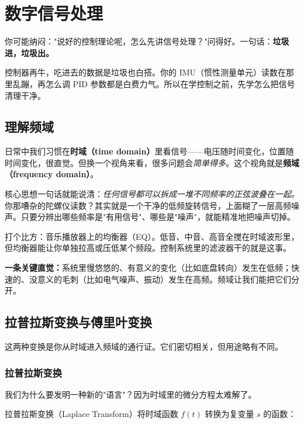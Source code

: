 \section{数字信号处理}

你可能纳闷："说好的控制理论呢，怎么先讲信号处理？"问得好。一句话：\textbf{垃圾进，垃圾出。}

控制器再牛，吃进去的数据是垃圾也白搭。你的 IMU（惯性测量单元）读数在那里乱蹦，再怎么调 PID 参数都是白费力气。所以在学控制之前，先学怎么把信号清理干净。

\subsection{理解频域}

日常中我们习惯在\textbf{时域（time domain）}里看信号——电压随时间变化，位置随时间变化，很直觉。但换一个视角来看，很多问题会\textit{简单得多}。这个视角就是\textbf{频域（frequency domain）}。

核心思想一句话就能说清：\textit{任何信号都可以拆成一堆不同频率的正弦波叠在一起。}你那嘈杂的陀螺仪读数？其实就是一个干净的低频旋转信号，上面糊了一层高频噪声。只要分辨出哪些频率是"有用信号"、哪些是"噪声"，就能精准地把噪声切掉。

打个比方：音乐播放器上的均衡器（EQ）。低音、中音、高音全搅在时域波形里，但均衡器能让你单独拉高或压低某个频段。控制系统里的滤波器干的就是这事。

\textbf{一条关键直觉：}系统里慢悠悠的、有意义的变化（比如底盘转向）发生在低频；快速的、没意义的毛刺（比如电气噪声、振动）发生在高频。频域让我们能把它们分开。

\subsection{拉普拉斯变换与傅里叶变换}

这两种变换是你从时域进入频域的通行证。它们密切相关，但用途略有不同。

\subsubsection{拉普拉斯变换}

我们为什么要发明一种新的"语言"？因为时域里的微分方程太难解了。

拉普拉斯变换（Laplace Transform）将时域函数 $f(t)$ 转换为复变量 $s$ 的函数：


